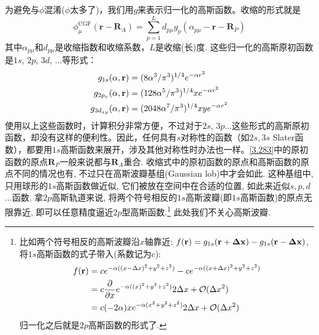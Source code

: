 为避免与$\phi$混淆($\phi$太多了)，我们用$g$来表示归一化的高斯函数。收缩的形式就是
\begin{equation}
\phi^\mathrm{CGF}_\mu(\mathbf{r-R}_A)=\sum_{p=1}^{L}d_{p\mu}g_p(\alpha_{p\mu}-\mathbf{r-R}_P)
\end{equation}
其中$\alpha_{p\mu}$和$d_{p\mu}$是收缩指数和收缩系数，$L$是收缩(长)度. 这些归一化的高斯原初函数是$1s$, $2p$, $3d$, ...等形式：
\begin{align}
g_{1s}(\alpha,\mathbf{r})      & = (8\alpha^3/\pi^3)^{1/4}       e^{-\alpha r^2}\\
g_{2p_x}(\alpha,\mathbf{r})    & = (128\alpha^5/\pi^3)^{1/4}  x  e^{-\alpha r^2}\\
g_{3d_{xy}}(\alpha,\mathbf{r}) & = (2048\alpha^7/\pi^3)^{1/4} xy e^{-\alpha r^2}
\end{align}
使用以上这些函数时，计算积分非常方便，不过对于$2s$, $3p$...这些形式的高斯原初函数，却没有这样的便利性。因此，任何具有$s$对称性的函数（如$2s,3s$ Slater函数），都要用$1s$高斯函数来展开，涉及其他对称性时办法也一样。\eqref{3.283}中的原初函数的原点$\mathbf{R}_P$一般来说都与$\mathbf{R}_A$重合. 收缩式中的原初函数的原点和高斯函数的原点不同的情况也有, 不过只在高斯波瓣基组(Gaussian lob)中才会如此. 这种基组中, 只用球形的$1s$高斯函数做近似, 它们被放在空间中在合适的位置, 如此来近似$s,p,d$...函数. 拿$2p$高斯轨道来说, 将两个符号相反的$1s$高斯波瓣(即$1s$高斯函数)的原点无限靠近, 即可以任意精度逼近$2p$型高斯函数.\footnote{
比如两个符号相反的高斯波瓣沿$x$轴靠近: $f(\mathbf{r})=g_{1s}(\mathbf{r}+\mathbf{\Delta x})-g_{1s}(\mathbf{r}-\mathbf{\Delta x})$, 将$1s$高斯函数的式子带入(系数记为$c$):
\begin{align*}
f(\mathbf{r}) & = ce^{-\alpha((x-\Delta x)^2+y^2+z^2)}-
ce^{-\alpha((x+\Delta x)^2+y^2+z^2)}\\
        & = c\frac{\partial}{\partial x}e^{-\alpha((x)^2+y^2+z^2)}2\Delta x +\mathcal{O}(\Delta x^2)\\
        & = c(-2\alpha) xe^{-\alpha(x^2+y^2+z^2)}2\Delta x +\mathcal{O}(\Delta x^2)
\end{align*}
归一化之后就是$2p$高斯函数的形式了.
}
此处我们不关心高斯波瓣.

